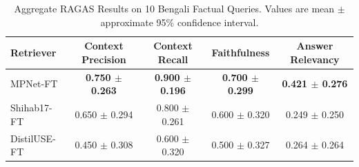 \documentclass[manuscript,screen,review]{acmart}
\begin{document}
\begin{table}[t]
    \centering
    \caption{Aggregate RAGAS Results on 10 Bengali Factual Queries. Values are mean $\pm$ approximate 95\% confidence interval.}
    \label{tab:ragas_aggregate}
    \small
    \begin{tabular}{lcccc}
        \toprule
        \textbf{Retriever} & \textbf{Context Precision} & \textbf{Context Recall} & \textbf{Faithfulness} & \textbf{Answer Relevancy} \\
        \midrule
        MPNet-FT & \textbf{0.750 $\pm$ 0.263} & \textbf{0.900 $\pm$ 0.196} & \textbf{0.700 $\pm$ 0.299} & \textbf{0.421 $\pm$ 0.276} \\
        Shihab17-FT & 0.650 $\pm$ 0.294 & 0.800 $\pm$ 0.261 & 0.600 $\pm$ 0.320 & 0.249 $\pm$ 0.250 \\
        DistilUSE-FT & 0.450 $\pm$ 0.308 & 0.600 $\pm$ 0.320 & 0.500 $\pm$ 0.327 & 0.264 $\pm$ 0.264 \\
        \bottomrule
    \end{tabular}
\end{table}
\end{document}
